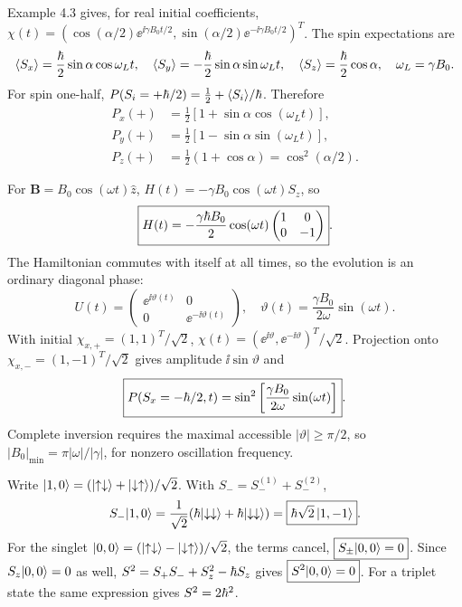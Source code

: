 Example 4.3 gives, for real initial coefficients,
$\chi(t)=(\cos(\alpha/2)\ee^{\ii\gamma B_0t/2},
\sin(\alpha/2)\ee^{-\ii\gamma B_0t/2})^T$.
The spin expectations are
\begin{equation}
\langle S_x\rangle=\frac{\hbar}2\sin\alpha\cos\omega_Lt,\quad
\langle S_y\rangle=-\frac{\hbar}2\sin\alpha\sin\omega_Lt,\quad
\langle S_z\rangle=\frac{\hbar}2\cos\alpha,\quad \omega_L=\gamma B_0.
\end{equation}
For spin one-half,
$P(S_i=+\hbar/2)=\frac12+\langle S_i\rangle/\hbar$.
Therefore
\begin{align}
\boxed{P_x(+)}&=\frac12[1+\sin\alpha\cos(\omega_Lt)],\\
\boxed{P_y(+)}&=\frac12[1-\sin\alpha\sin(\omega_Lt)],\\
\boxed{P_z(+)}&=\frac12(1+\cos\alpha)=\cos^2(\alpha/2).
\end{align}

For $\mathbf B=B_0\cos(\omega t)\hat z$,
$H(t)=-\gamma B_0\cos(\omega t)S_z$,
so
\begin{equation}
\boxed{H(t)=-\frac{\gamma\hbar B_0}{2}
\cos(\omega t)\begin{pmatrix}1&0\\0&-1\end{pmatrix}}.
\end{equation}
The Hamiltonian commutes with itself at all times,
so the evolution is an ordinary diagonal phase:
\begin{equation}
\boxed{U(t)=
\begin{pmatrix}\ee^{\ii\vartheta(t)}&0\\
0&\ee^{-\ii\vartheta(t)}\end{pmatrix}},
\quad
\vartheta(t)=\frac{\gamma B_0}{2\omega}\sin(\omega t).
\end{equation}
With initial $\chi_{x,+}=(1,1)^T/\sqrt2$,
$\chi(t)=
(\ee^{\ii\vartheta},\ee^{-\ii\vartheta})^T/\sqrt2$.
Projection onto $\chi_{x,-}=(1,-1)^T/\sqrt2$
gives amplitude $\ii\sin\vartheta$ and
\begin{equation}
\boxed{P(S_x=-\hbar/2,t)=
\sin^2\left[\frac{\gamma B_0}{2\omega}\sin(\omega t)\right]}.
\end{equation}
Complete inversion requires the maximal accessible
$|\vartheta|\ge\pi/2$, so
$\boxed{|B_0|_{\min}=\pi|\omega|/|\gamma|}$,
for nonzero oscillation frequency.

Write $\lvert 1,0\rangle=(\lvert \uparrow\downarrow\rangle+
\lvert \downarrow\uparrow\rangle)/\sqrt2$.
With $S_-=S_-^{(1)}+S_-^{(2)}$,
\begin{equation}
S_-\lvert 1,0\rangle=
\frac1{\sqrt2}(\hbar\lvert \downarrow\downarrow\rangle
+\hbar\lvert \downarrow\downarrow\rangle)
=\boxed{\hbar\sqrt2\,\lvert 1,-1\rangle}.
\end{equation}
For the singlet
$\lvert 0,0\rangle=(\lvert \uparrow\downarrow\rangle-
\lvert \downarrow\uparrow\rangle)/\sqrt2$,
the terms cancel,
$\boxed{S_\pm\lvert 0,0\rangle=0}$.
Since $S_z\lvert 0,0\rangle=0$ as well,
$S^2=S_+S_-+S_z^2-\hbar S_z$
gives $\boxed{S^2\lvert 0,0\rangle=0}$.
For a triplet state the same expression gives
$S^2=2\hbar^2$.


